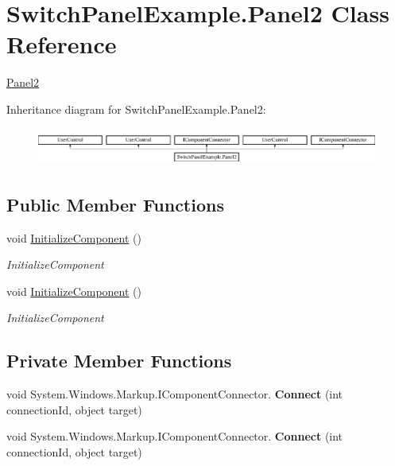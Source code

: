 \hypertarget{class_switch_panel_example_1_1_panel2}{}\section{Switch\+Panel\+Example.\+Panel2 Class Reference}
\label{class_switch_panel_example_1_1_panel2}


\mbox{\hyperlink{class_switch_panel_example_1_1_panel2}{Panel2}}  


Inheritance diagram for Switch\+Panel\+Example.\+Panel2\+:\begin{figure}[H]
\begin{center}
\leavevmode
\includegraphics[height=1.251397cm]{d3/dd3/class_switch_panel_example_1_1_panel2}
\end{center}
\end{figure}
\subsection*{Public Member Functions}
\begin{DoxyCompactItemize}
\item 
void \mbox{\hyperlink{class_switch_panel_example_1_1_panel2_a3b007f0bc09ec886aa6d457e333891a4}{Initialize\+Component}} ()
\begin{DoxyCompactList}\small\item\em Initialize\+Component \end{DoxyCompactList}\item 
void \mbox{\hyperlink{class_switch_panel_example_1_1_panel2_a3b007f0bc09ec886aa6d457e333891a4}{Initialize\+Component}} ()
\begin{DoxyCompactList}\small\item\em Initialize\+Component \end{DoxyCompactList}\end{DoxyCompactItemize}
\subsection*{Private Member Functions}
\begin{DoxyCompactItemize}
\item 
\mbox{\label{class_switch_panel_example_1_1_panel2_a4c66f989fa9fa9501cf91b45bd1da70e}} 
void System.\+Windows.\+Markup.\+I\+Component\+Connector. {\bfseries Connect} (int connection\+Id, object target)
\item 
\mbox{\label{class_switch_panel_example_1_1_panel2_a4c66f989fa9fa9501cf91b45bd1da70e}} 
void System.\+Windows.\+Markup.\+I\+Component\+Connector. {\bfseries Connect} (int connection\+Id, object target)
\end{DoxyCompactItemize}
